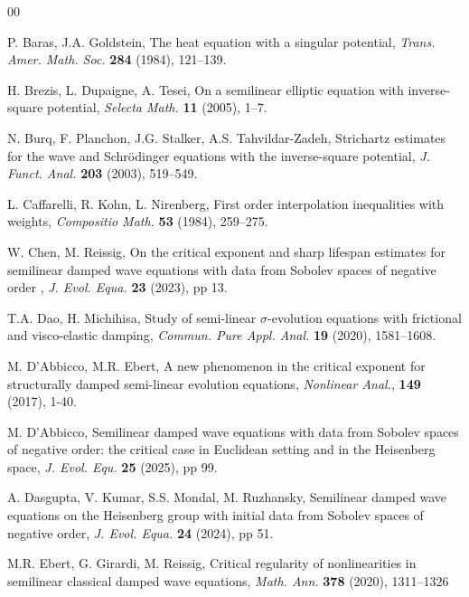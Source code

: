 \documentclass[11pt,reqno]{amsart}
\begin{document}
 
 \begin{thebibliography}{00}
 
 P. Baras, J.A. Goldstein, The heat equation with a singular potential, \textit{Trans. Amer. Math. Soc. }
\textbf{284} (1984), 121–139.

 H. Brezis, L. Dupaigne, A. Tesei, On a semilinear elliptic equation with inverse-square
potential, \textit{Selecta Math. } \textbf{11} (2005), 1–7.

  N. Burq, F. Planchon, J.G. Stalker, A.S. Tahvildar-Zadeh, Strichartz estimates for the wave
and Schr\"odinger equations with the inverse-square potential, \textit{J. Funct. Anal. } \textbf{203} (2003), 519–549.


 L. Caffarelli, R. Kohn, L. Nirenberg, First order interpolation inequalities with weights, \textit{Compositio Math.}
\textbf{53} (1984), 259–275.
 
 W. Chen, M. Reissig, On the critical exponent and sharp lifespan estimates for semilinear damped wave equations with data from Sobolev spaces of negative order , \textit{J. Evol. Equa. } \textbf{23} (2023), pp 13.

 T.A. Dao, H. Michihisa, Study of semi-linear $\sigma$-evolution equations with frictional and visco-elastic damping, \textit{Commun. Pure Appl. Anal.} \textbf{19} (2020), 1581--1608.



 M. D'Abbicco, M.R. Ebert, A new phenomenon in the critical exponent for structurally damped semi-linear evolution equations, \textit{Nonlinear Anal.}, \textbf{149} (2017), 1-40.

 M. D'Abbicco, Semilinear damped wave equations with data from Sobolev spaces of negative order: the critical case in Euclidean setting and in the Heisenberg space, \textit{J. Evol. Equ. } \textbf{25} (2025), pp 99.

 A. Dasgupta, V. Kumar, S.S. Mondal, M. Ruzhansky, Semilinear damped wave equations on the Heisenberg group with initial data from Sobolev spaces of negative order, \textit{J. Evol. Equa.} \textbf{24}  (2024), pp 51.


  M.R. Ebert, G. Girardi, M. Reissig, Critical regularity of nonlinearities in semilinear classical damped
wave equations, \textit{ Math. Ann.} \textbf{378} (2020), 1311–1326


\end{thebibliography}
\end{document}
